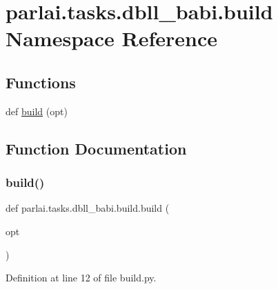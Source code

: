 \hypertarget{namespaceparlai_1_1tasks_1_1dbll__babi_1_1build}{}\section{parlai.\+tasks.\+dbll\+\_\+babi.\+build Namespace Reference}
\label{namespaceparlai_1_1tasks_1_1dbll__babi_1_1build}
\subsection*{Functions}
\begin{DoxyCompactItemize}
\item 
def \hyperlink{namespaceparlai_1_1tasks_1_1dbll__babi_1_1build_a40dc7acf84e5e6146717376b2411d42e}{build} (opt)
\end{DoxyCompactItemize}


\subsection{Function Documentation}
\mbox{\label{namespaceparlai_1_1tasks_1_1dbll__babi_1_1build_a40dc7acf84e5e6146717376b2411d42e}} 
\subsubsection{\texorpdfstring{build()}{build()}}
{\footnotesize\ttfamily def parlai.\+tasks.\+dbll\+\_\+babi.\+build.\+build (\begin{DoxyParamCaption}\item[{}]{opt }\end{DoxyParamCaption})}



Definition at line 12 of file build.\+py.

